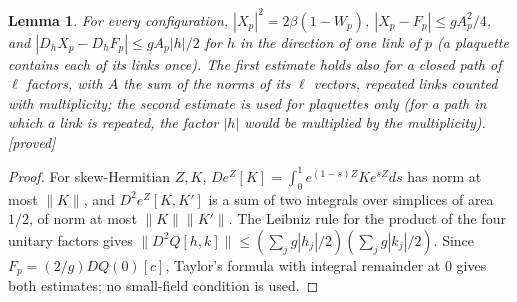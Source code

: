 \documentclass[11pt,a4paper]{article}
\theoremstyle{plain}
\newtheorem{lemma}[theorem]{Lemma}
\theoremstyle{definition}
\theoremstyle{remark}
\numberwithin{equation}{section}
\newcommand{\st}[1]{\textsf{[#1]}}
\begin{document}
\begin{lemma}\label{lem:quat}
For every configuration, $|X_p|^2=2\beta(1-W_p)$, $|X_p-F_p|\le gA_p^2/4$, and $|D_hX_p-D_hF_p|\le gA_p|h|/2$ for $h$ in the direction of
one link of $p$ (a plaquette contains each of its links once). The first estimate holds also for a closed path of $\ell$ factors, with $A$ the sum of the norms of its $\ell$ vectors, repeated links counted with multiplicity; the second estimate is used for plaquettes only (for a path in which a link is repeated, the factor $|h|$ would be multiplied by the multiplicity). \st{proved}
\end{lemma}
\begin{proof}
For skew-Hermitian $Z,K$, $De^Z[K]=\int_0^1e^{(1-s)Z}Ke^{sZ}ds$ has norm at most $\|K\|$, and $D^2e^Z[K,K']$ is a sum of two integrals over
simplices of area $1/2$, of norm at most $\|K\|\|K'\|$. The Leibniz rule for the product of the four unitary factors gives
$\|D^2Q[h,k]\|\le(\sum_jg|h_j|/2)(\sum_jg|k_j|/2)$. Since $F_p=(2/g)DQ(0)[c]$, Taylor's formula with integral remainder at $0$ gives both
estimates; no small-field condition is used.
\end{proof}
\end{document}
